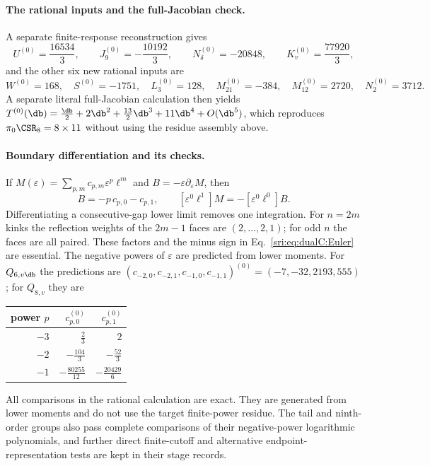 \paragraph{The rational inputs and the full-Jacobian check.} A separate finite-response reconstruction gives
\begin{equation}
 U^{(0)}=\frac{16534}{3},\qquad J_9^{(0)}=-\frac{10192}{3},\qquad N_\delta^{(0)}=-20848,\qquad K_v^{(0)}=\frac{77920}{3},
\end{equation}
and the other six new rational inputs are
\begin{equation}
 W^{(0)}=168,\quad S^{(0)}=-1751,\quad L_3^{(0)}=128,\quad M_{21}^{(0)}=-384,\quad M_{12}^{(0)}=2720,\quad
 N_2^{(0)}=3712.
\end{equation}
A separate literal full-Jacobian calculation then yields
$T^{(0)}(\db)=\frac{\db}{2}+2\db^2+\frac{13}{2}\db^3+11\db^4+O(\db^5)$, which reproduces $\pi_0\CSR_8=8\times11$ without
using the residue assembly above.

\paragraph{Boundary differentiation and its checks.} If $M(\varepsilon)=\sum_{p,m}c_{p,m}\varepsilon^p\ell^m$ and
$B=-\varepsilon\partial_\varepsilon M$, then
\begin{equation}
 [\varepsilon^p\ell^0]B=-p\,c_{p,0}-c_{p,1},\qquad [\varepsilon^0\ell^1]M=-[\varepsilon^0\ell^0]B.
 \label{sri:eq:dualC:Euler}
\end{equation}
Differentiating a consecutive-gap lower limit removes one integration. For $n=2m$ kinks the reflection weights of the
$2m-1$ faces are $(2,\ldots,2,1)$; for odd $n$ the faces are all paired. These factors and the minus sign in
Eq.~\eqref{sri:eq:dualC:Euler} are essential. The negative powers of $\varepsilon$ are predicted from lower moments. For
$Q_{6,v\db}$ the predictions are $(c_{-2,0},c_{-2,1},c_{-1,0},c_{-1,1})^{(0)}=(-7,-32,2193,555)$; for $Q_{8,v}$ they are
\begin{center}\small
\begin{tabular}{@{}rrr@{}}
\toprule
power $p$ & $c_{p,0}^{(0)}$ & $c_{p,1}^{(0)}$\\
\midrule
$-3$ & $\frac23$ & $2$\\[2pt]
$-2$ & $-\frac{104}{3}$ & $-\frac{52}{3}$\\[2pt]
$-1$ & $-\frac{80255}{12}$ & $-\frac{20429}{6}$\\
\bottomrule
\end{tabular}
\end{center}
All comparisons in the rational calculation are exact. They are generated from lower moments and do not use the target
finite-power residue. The tail and ninth-order groups also pass complete comparisons of their negative-power
logarithmic polynomials, and further direct finite-cutoff and alternative endpoint-representation tests are kept in
their stage records.

